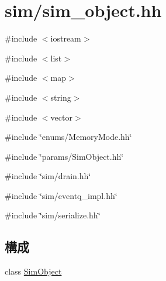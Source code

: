 \hypertarget{sim__object_8hh}{
\section{sim/sim\_\-object.hh}
\label{sim__object_8hh}
}
{\ttfamily \#include $<$iostream$>$}\par
{\ttfamily \#include $<$list$>$}\par
{\ttfamily \#include $<$map$>$}\par
{\ttfamily \#include $<$string$>$}\par
{\ttfamily \#include $<$vector$>$}\par
{\ttfamily \#include \char`\"{}enums/MemoryMode.hh\char`\"{}}\par
{\ttfamily \#include \char`\"{}params/SimObject.hh\char`\"{}}\par
{\ttfamily \#include \char`\"{}sim/drain.hh\char`\"{}}\par
{\ttfamily \#include \char`\"{}sim/eventq\_\-impl.hh\char`\"{}}\par
{\ttfamily \#include \char`\"{}sim/serialize.hh\char`\"{}}\par
\subsection*{構成}
\begin{DoxyCompactItemize}
\item 
class \hyperlink{classSimObject}{SimObject}
\end{DoxyCompactItemize}
